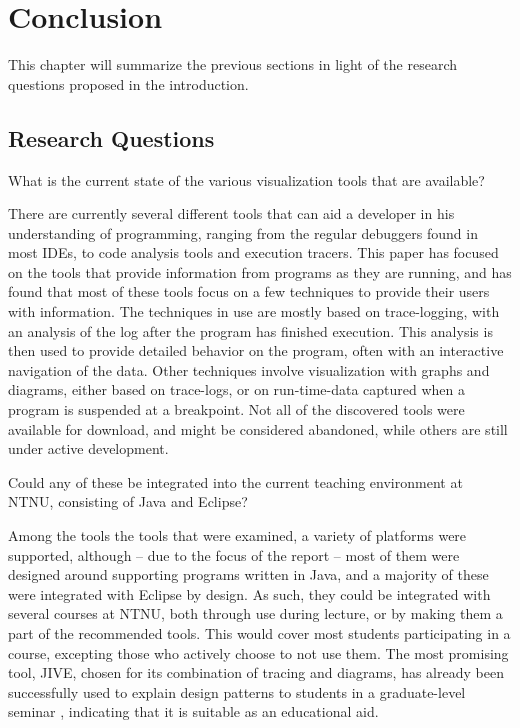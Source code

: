 \chapter{Conclusion}\label{conclusion}
This chapter will summarize the previous sections in light of the research questions proposed in the introduction.
\section{Research Questions}\label{conclusionRQs}


\begin{theorem}
What is the current state of the various visualization tools that are available?
\end{theorem}

There are currently several different tools that can aid a developer in his understanding of programming, ranging from the regular debuggers found in most IDEs, to code analysis tools and execution tracers.
This paper has focused on the tools that provide information from programs as they are running, and has found that most of these tools focus on a few techniques to provide their users with information.
The techniques in use are mostly based on trace-logging, with an analysis of the log after the program has finished execution.
This analysis is then used to provide detailed behavior on the program, often with an interactive navigation of the data.
Other techniques involve visualization with graphs and diagrams, either based on trace-logs, or on run-time-data captured when a program is suspended at a breakpoint.
Not all of the discovered tools were available for download, and might be considered abandoned, while others are still under active development.
~\\

\begin{theorem}
Could any of these be integrated into the current teaching environment at NTNU, consisting of Java and Eclipse?
\end{theorem}

Among the tools the tools that were examined, a variety of platforms were supported, although -- due to the focus of the report -- most of them were designed around supporting programs written in Java, and a majority of these were integrated with Eclipse by design.
As such, they could be integrated with several courses at NTNU, both through use during lecture, or by making them a part of the recommended tools.
This would cover most students participating in a course, excepting those who actively choose to not use them.
The most promising tool, JIVE, chosen for its combination of tracing and diagrams, has already been successfully used to explain design patterns to students in a graduate-level seminar \cite[p. 99]{Gestwicki2005}, indicating that it is suitable as an educational aid.
~\\

